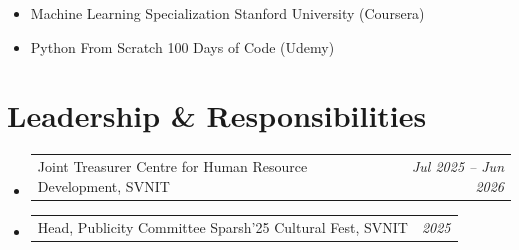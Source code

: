\documentclass[10pt,letterpaper]{article}
\makeatletter
\newcommand{\sideEntry}[2]{%
  \noindent
  \begin{tabularx}{\linewidth}{@{}X r@{}}
    #1 & \small\textit{#2}
  \end{tabularx}%
}
\makeatother
\begin{document}
\begin{itemize}[leftmargin=0pt, label={}]
  \item Machine Learning Specialization \textemdash{} Stanford University (Coursera)
  \item Python From Scratch \textemdash{} 100 Days of Code (Udemy)
\end{itemize}

\section{Leadership \& Responsibilities}

\begin{itemize}[leftmargin=0pt, label={}]
  \item \sideEntry{Joint Treasurer \textemdash{} Centre for Human Resource Development, SVNIT}{Jul 2025 -- Jun 2026}
  \item \sideEntry{Head, Publicity Committee \textemdash{} Sparsh'25 Cultural Fest, SVNIT}{2025}
\end{itemize}

\end{document}
